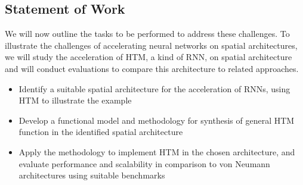 


\subsection{Statement of Work}

We will now outline the tasks to be performed to address these challenges.
To illustrate the challenges of accelerating neural networks on spatial architectures, we will study the acceleration of HTM, a kind of RNN, on spatial architecture and will conduct evaluations to compare this architecture to related approaches.

\begin{itemize}
    \item Identify a suitable spatial architecture for the acceleration of RNNs, using HTM to illustrate the example
    \item Develop a functional model and methodology for synthesis of general HTM function in the identified spatial architecture
    \item Apply the methodology to implement HTM in the chosen architecture, and evaluate performance and scalability in comparison to von Neumann architectures using suitable benchmarks
\end{itemize}

